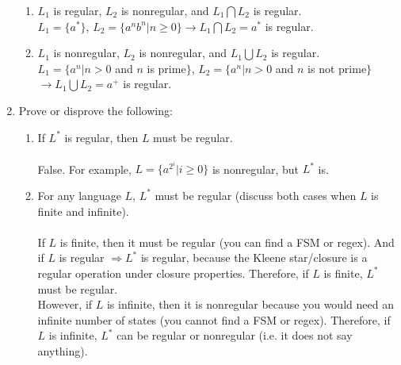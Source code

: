 \documentclass[10pt,a4paper,final]{article}
\begin{document}
\begin{enumerate}
\begin{enumerate}
  \item $L_1$ is regular, $L_2$ is nonregular, and $L_1 \bigcap L_2$ is regular.\\
  $L_1 = \{a^*\},\, L_2 = \{a^n b^n | n \geq 0\} \rightarrow L_1 \bigcap L_2 = a^*$ is regular.
  
  \item $L_1$ is nonregular, $L_2$ is nonregular, and $L_1 \bigcup L_2$ is regular.\\
  $L_1 = \{a^n | n > 0$ and $n$ is prime$\},\, L_2 = \{a^n | n > 0$ and $n$ is not prime$\}$
  $\rightarrow L_1 \bigcup L_2 = a^+$ is regular.
  \end{enumerate}

\item %
Prove or disprove the following:
  \begin{enumerate}
  \item If $L^*$ is regular, then $L$ must be regular.\\
  \\
  False. For example, $L = \{a^{2^i} | i \geq 0\}$ is nonregular, but $L^*$ is.
  
  \item For any language $L$, $L^*$ must be regular
  (discuss both cases when $L$ is finite and infinite).\\
  \\
  If $L$ is finite, then it must be regular (you can find a FSM or regex).
  And if $L$ is regular $\Rightarrow L^*$ is regular, because
  the Kleene star/closure is a regular operation under closure properties.
  Therefore, if $L$ is finite, $L^*$ must be regular.\\
  However, if $L$ is infinite, then it is nonregular because you would need an
  infinite number of states (you cannot find a FSM or regex).
  Therefore, if $L$ is infinite, $L^*$ can be regular or nonregular (i.e. it does not say anything).
  \end{enumerate}
  

\end{enumerate}
\end{document}
